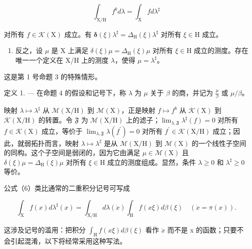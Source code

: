 \[
\int_ {\mathrm{X} / \mathrm{H}} f ^ {b} d \lambda = \int_ {\mathrm{X}} f d \lambda^ {\sharp}\tag{6}
\]

对所有 \(f \in \mathcal{K}(\mathrm{X})\) 成立。有 \(\pmb{\delta}(\xi)\lambda^{\sharp} = \Delta_{\mathrm{H}}(\xi)\lambda^{\sharp}\) 对所有 \(\xi \in \mathrm{H}\) 成立。

\begin{enumerate}
\def\labelenumi{\alph{enumi})}
\setcounter{enumi}{1}
\tightlist
\item
  反之，设 \(\mu\) 是 X 上满足 \(\delta(\xi)\mu = \Delta_{\mathrm{H}}(\xi)\mu\) 对所有 \(\xi \in \mathrm{H}\) 成立的测度。存在唯一一个定义在 X/H 上的测度 \(\lambda\)，使得 \(\mu = \lambda^{\sharp}\)。
\end{enumerate}

这是第 1 号命题 3 的特殊情形。

定义 1. --- 在命题 4 的假设和记号下，称 \(\lambda\) 为 \(\mu\) 关于 \(\beta\) 的商，并记为 \(\frac{\mu}{\beta}\) 或 \(\mu/\beta\)。

映射 \(\lambda \mapsto \lambda^{\sharp}\) 从 \(\mathcal{M}(\mathrm{X / H})\) 到 \(\mathcal{M}(\mathrm{X})\)，正是映射 \(f\mapsto f^{b}\) 从 \(\mathcal{K}(\mathrm{X})\) 到 \(\mathcal{K}(\mathrm{X / H})\) 的转置。令 \(\mathfrak{F}\) 为 \(\mathcal{M}(\mathrm{X / H})\) 上的滤子；\(\lim_{\lambda ,\mathfrak{F}}\lambda^{\sharp}(f) = 0\) 对所有 \(f\in \mathcal{K}(\mathrm{X})\) 成立，等价于 \(\lim_{\lambda ,\mathfrak{F}}\lambda (f^{\prime}) = 0\) 对所有 \(f^{\prime}\in \mathcal{K}(\mathrm{X / H})\) 成立；因此，就弱拓扑而言，映射 \(\lambda \mapsto \lambda^{\sharp}\) 是从 \(\mathcal{M}(\mathrm{X / H})\) 到 \(\mathcal{M}(\mathrm{X})\) 的一个线性子空间的同构。这个子空间是弱闭的，因为它由满足 \(\mu \in \mathcal{M}(\mathrm{X})\) 且 \(\delta (\xi)\mu = \Delta_{\mathrm{H}}(\xi)\mu\) 对所有 \(\xi \in \mathrm{H}\) 成立的测度组成。显然，条件 \(\lambda \geqslant 0\) 和 \(\lambda^{\sharp}\geqslant 0\) 等价。

公式（6）类比通常的二重积分记号可写成

\[
\int_ {\mathrm{X}} f (x) d \lambda^ {\sharp} (x) = \int_ {\mathrm{X/H}} d \lambda (\dot {x}) \int_ {\mathrm{H}} f (x \xi) d \beta (\xi) \quad (\dot {x} = \pi (x)).\tag{7}
\]

这涉及记号的滥用：把积分 \(\int_{\mathrm{H}} f(x\xi) d\beta(\xi)\) 看作 \(\dot{x}\) 而不是 x 的函数；只要不会引起混淆，以下将经常采用这种写法。
